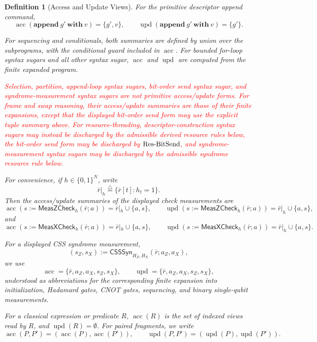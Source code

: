 \documentclass[acmsmall,screen,review,anonymous,nonacm]{acmart}
\newtheorem{definition}{Definition}[section]
\theoremstyle{defn_style}
\begin{document}
\begin{definition}[Access and Update Views]
For the primitive descriptor append command,
\[
\operatorname{acc}(\mathbf{append}\ g'\ \mathbf{with}\ v)=\{g',v\},
\qquad
\operatorname{upd}(\mathbf{append}\ g'\ \mathbf{with}\ v)=\{g'\}.
\]

For sequencing and conditionals, both summaries are defined by union over the
subprograms, with the conditional guard included in \(\operatorname{acc}\).
For bounded for-loop syntax sugars and all other syntax sugar,
\(\operatorname{acc}\) and \(\operatorname{upd}\) are computed from the finite
expanded program.

\textcolor{red}{Selection, partition, append-loop syntax sugars, bit-order send syntax sugar, and syndrome-measurement syntax sugars are not primitive access/update forms. For frame and swap reasoning, their access/update summaries are those of their finite expansions, except that the displayed bit-order send form may use the explicit tuple summary above. For resource-threading, descriptor-construction syntax sugars may instead be discharged by the admissible derived resource rules below, the bit-order send form may be discharged by \({\rm Res\mbox{-}BitSend}\), and syndrome-measurement syntax sugars may be discharged by the admissible syndrome resource rule below.}


For convenience, if \(h\in\{0,1\}^{N}\), write
\[
\bar r|_h
\stackrel{\triangle}{=}
\{\bar r[t]:h_t=1\}.
\]
Then the access/update summaries of the displayed check measurements are
\[
\operatorname{acc}
\left(
s:=\mathsf{MeasZCheck}_{h}(\bar r;a)
\right)
=
\bar r|_h\cup\{a,s\},
\qquad
\operatorname{upd}
\left(
s:=\mathsf{MeasZCheck}_{h}(\bar r;a)
\right)
=
\bar r|_h\cup\{a,s\},
\]
and
\[
\operatorname{acc}
\left(
s:=\mathsf{MeasXCheck}_{h}(\bar r;a)
\right)
=
\bar r|_h\cup\{a,s\},
\qquad
\operatorname{upd}
\left(
s:=\mathsf{MeasXCheck}_{h}(\bar r;a)
\right)
=
\bar r|_h\cup\{a,s\}.
\]

For a displayed CSS syndrome measurement,
\[
(s_Z,s_X):=
\mathsf{CSSSyn}_{H_Z,H_X}(\bar r;a_Z,a_X),
\]
we use
\[
\operatorname{acc}
=
\{\bar r,a_Z,a_X,s_Z,s_X\},
\qquad
\operatorname{upd}
=
\{\bar r,a_Z,a_X,s_Z,s_X\},
\]
understood as abbreviations for the corresponding finite expansion into
initialization, Hadamard gates, CNOT gates, sequencing, and binary
single-qubit measurements.

For a classical expression or predicate \(R\),
\(\operatorname{acc}(R)\) is the set of indexed views read by \(R\), and
\(\operatorname{upd}(R)=\emptyset\).
For paired fragments, we write
\[
\operatorname{acc}(P,P')=(\operatorname{acc}(P),\operatorname{acc}(P')),
\qquad
\operatorname{upd}(P,P')=(\operatorname{upd}(P),\operatorname{upd}(P')).
\]
\end{definition}
\end{document}
